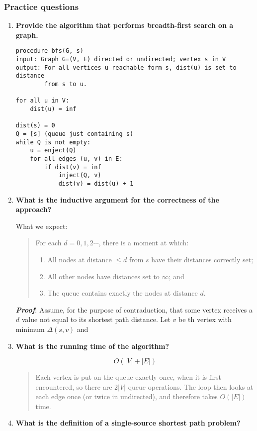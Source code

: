 \documentclass[a4paper,11pt]{article}
\begin{document}
\subsubsection{Practice questions}\label{practice-questions-13}

\begin{enumerate}
\def\labelenumi{\arabic{enumi}.}
\item
  \textbf{Provide the algorithm that performs breadth-first search on a
  graph.}

\begin{verbatim}
procedure bfs(G, s)
input: Graph G=(V, E) directed or undirected; vertex s in V
output: For all vertices u reachable form s, dist(u) is set to distance
        from s to u.

for all u in V:
    dist(u) = inf

dist(s) = 0
Q = [s] (queue just containing s)
while Q is not empty:
    u = enject(Q)
    for all edges (u, v) in E:
        if dist(v) = inf
            inject(Q, v)
            dist(v) = dist(u) + 1
\end{verbatim}
\item
  \textbf{What is the inductive argument for the correctness of the
  approach?}

  What we expect:

  \begin{quote}
  For each $d = 0, 1, 2 \cdots$, there is a moment at which:

  \begin{enumerate}
  \def\labelenumii{\arabic{enumii}.}
  \itemsep1pt\parskip0pt
  \item
    All nodes at distance $\le d$ from $s$ have their distances
    correctly set;
  \item
    All other nodes have distances set to $\infty$; and
  \item
    The queue contains exactly the nodes at distance $d$.
  \end{enumerate}
  \end{quote}

  \textbf{\emph{Proof}}: Assume, for the purpose of contraduction, that
  some vertex receives a $d$ value not equal to its shortest path
  distance. Let $v$ be th vertex with minimum $\Delta (s, v)$ and
\item
  \textbf{What is the running time of the algorithm?}

  \[O(|V| + |E|)\]

  \begin{quote}
  Each vertex is put on the queue exactly once, when it is first
  encountered, so there are $2|V|$ queue operations. The loop then looks
  at each edge once (or twice in undirected), and therefore takes
  $O(|E|)$ time.
  \end{quote}
\item
  \textbf{What is the definition of a single-source shortest path
  problem?}


\end{enumerate}
\end{document}
